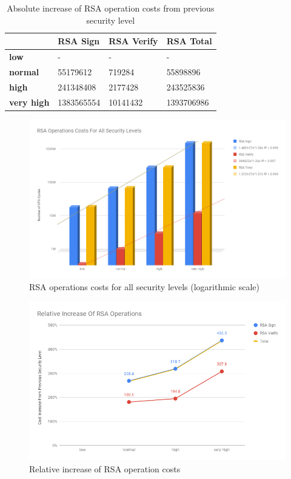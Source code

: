 \documentclass{llncs}
\begin{document}
\begin{table}[]
  \begin{tabular}{|l|l|l|l|}
  \hline
                     & \textbf{RSA Sign} & \textbf{RSA Verify} & \textbf{RSA Total} \\ \hline
  \textbf{low}       & -                 & -                   & -                  \\ \hline
  \textbf{normal}    & 55179612          & 719284              & 55898896           \\ \hline
  \textbf{high}      & 241348408         & 2177428             & 243525836          \\ \hline
  \textbf{very high} & 1383565554        & 10141432            & 1393706986         \\ \hline
  \end{tabular}
  \centering \caption{\label{table:rsa-absolute-cost-increase} Absolute increase of RSA operation costs from previous security level}
  \end{table}

\begin{figure}
  \centering
  \includegraphics[width=1.0\textwidth]{img/rsa_cost_all_sls.png}
  \centering \caption{\label{fig:rsa-costs-all-sls} RSA operations costs for all security levels (logarithmic scale)}
\end{figure}

\begin{figure}
  \centering
  \includegraphics[width=1.0\textwidth]{img/rsa_relative_increase.png}
  \centering \caption{\label{fig:rsa-pub-priv-cost-increase} Relative increase of RSA operation costs}
\end{figure}
\end{document}
